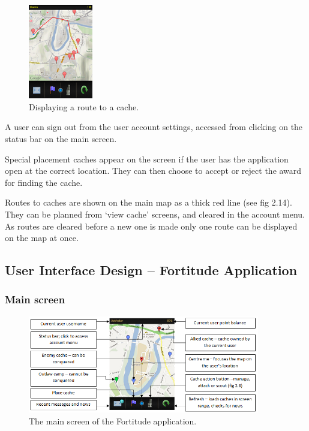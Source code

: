 \begin{figure}
	\vspace{-40pt}
	\begin{center}
	\includegraphics[width=0.25\textwidth]{images/route_mapping}
	\caption{Displaying a route to a cache.}
	\label{route_mapping}
	\end{center}
	\vspace{-80pt}
\end{figure}

A user can sign out from the user account settings, accessed from clicking on the status bar on the main screen.

Special placement caches appear on the screen if the user has the application open at the correct location. They can then choose to accept or reject the award for finding the cache.

Routes to caches are shown on the main map as a thick red line (see fig 2.14). They can be planned from ‘view cache’ screens, and cleared in the account menu. As routes are cleared before a new one is made only one route can be displayed on the map at once.
\vspace{30pt}

\subsection{User Interface Design – Fortitude Application}

\subsubsection{Main screen}

\begin{figure}[ht]
	\begin{center}
	\includegraphics[width=0.9\textwidth]{images/main_screen}
	\caption{The main screen of the Fortitude application.}
	\label{main_screen}
	\end{center}
\end{figure}

